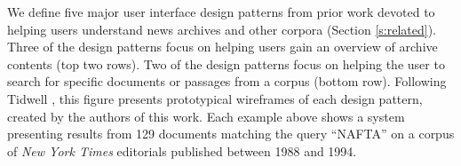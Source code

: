 We define five major user interface design patterns from prior work devoted to helping users understand news archives and other corpora (Section \ref{s:related}).
Three of the design patterns focus on helping users gain an overview of archive contents (top two rows).
Two of the design patterns focus on helping the user to search for specific documents or passages from a corpus (bottom row).
Following Tidwell \cite{Tidwell}, this figure presents prototypical wireframes of each design pattern, created by the authors of this work. 
Each example above shows a system presenting results from 129 documents matching the query ``NAFTA'' on a corpus of \textit{New York Times} editorials published between 1988 and 1994.